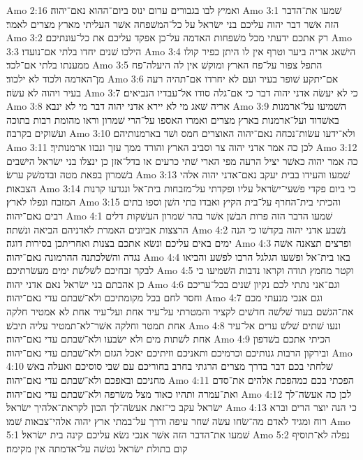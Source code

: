 Amo 2:16  ואמיץ לבו בגבורים ערום ינוס ביום־ההוא נאם־יהוה׃
Amo 3:1  שׁמעו את־הדבר הזה אשׁר דבר יהוה עליכם בני ישׂראל על כל־המשׁפחה אשׁר העליתי מארץ מצרים לאמר׃
Amo 3:2  רק אתכם ידעתי מכל משׁפחות האדמה על־כן אפקד עליכם את כל־עונתיכם׃
Amo 3:3  הילכו שׁנים יחדו בלתי אם־נועדו׃
Amo 3:4  הישׁאג אריה ביער וטרף אין לו היתן כפיר קולו ממענתו בלתי אם־לכד׃
Amo 3:5  התפל צפור על־פח הארץ ומוקשׁ אין לה היעלה־פח מן־האדמה ולכוד לא ילכוד׃
Amo 3:6  אם־יתקע שׁופר בעיר ועם לא יחרדו אם־תהיה רעה בעיר ויהוה לא עשׂה׃
Amo 3:7  כי לא יעשׂה אדני יהוה דבר כי אם־גלה סודו אל־עבדיו הנביאים׃
Amo 3:8  אריה שׁאג מי לא יירא אדני יהוה דבר מי לא ינבא׃
Amo 3:9  השׁמיעו על־ארמנות באשׁדוד ועל־ארמנות בארץ מצרים ואמרו האספו על־הרי שׁמרון וראו מהומת רבות בתוכה ועשׁוקים בקרבה׃
Amo 3:10  ולא־ידעו עשׂות־נכחה נאם־יהוה האוצרים חמס ושׁד בארמנותיהם׃
Amo 3:11  לכן כה אמר אדני יהוה צר וסביב הארץ והורד ממך עזך ונבזו ארמנותיך׃
Amo 3:12  כה אמר יהוה כאשׁר יציל הרעה מפי הארי שׁתי כרעים או בדל־אזן כן ינצלו בני ישׂראל הישׁבים בשׁמרון בפאת מטה ובדמשׁק ערשׂ׃
Amo 3:13  שׁמעו והעידו בבית יעקב נאם־אדני יהוה אלהי הצבאות׃
Amo 3:14  כי ביום פקדי פשׁעי־ישׂראל עליו ופקדתי על־מזבחות בית־אל ונגדעו קרנות המזבח ונפלו לארץ׃
Amo 3:15  והכיתי בית־החרף על־בית הקיץ ואבדו בתי השׁן וספו בתים רבים נאם־יהוה׃
Amo 4:1  שׁמעו הדבר הזה פרות הבשׁן אשׁר בהר שׁמרון העשׁקות דלים הרצצות אביונים האמרת לאדניהם הביאה ונשׁתה׃
Amo 4:2  נשׁבע אדני יהוה בקדשׁו כי הנה ימים באים עליכם ונשׂא אתכם בצנות ואחריתכן בסירות דוגה׃
Amo 4:3  ופרצים תצאנה אשׁה נגדה והשׁלכתנה ההרמונה נאם־יהוה׃
Amo 4:4  באו בית־אל ופשׁעו הגלגל הרבו לפשׁע והביאו לבקר זבחיכם לשׁלשׁת ימים מעשׂרתיכם׃
Amo 4:5  וקטר מחמץ תודה וקראו נדבות השׁמיעו כי כן אהבתם בני ישׂראל נאם אדני יהוה׃
Amo 4:6  וגם־אני נתתי לכם נקיון שׁנים בכל־עריכם וחסר לחם בכל מקומתיכם ולא־שׁבתם עדי נאם־יהוה׃
Amo 4:7  וגם אנכי מנעתי מכם את־הגשׁם בעוד שׁלשׁה חדשׁים לקציר והמטרתי על־עיר אחת ועל־עיר אחת לא אמטיר חלקה אחת תמטר וחלקה אשׁר־לא־תמטיר עליה תיבשׁ׃
Amo 4:8  ונעו שׁתים שׁלשׁ ערים אל־עיר אחת לשׁתות מים ולא ישׂבעו ולא־שׁבתם עדי נאם־יהוה׃
Amo 4:9  הכיתי אתכם בשׁדפון ובירקון הרבות גנותיכם וכרמיכם ותאניכם וזיתיכם יאכל הגזם ולא־שׁבתם עדי נאם־יהוה׃
Amo 4:10  שׁלחתי בכם דבר בדרך מצרים הרגתי בחרב בחוריכם עם שׁבי סוסיכם ואעלה באשׁ מחניכם ובאפכם ולא־שׁבתם עדי נאם־יהוה׃
Amo 4:11  הפכתי בכם כמהפכת אלהים את־סדם ואת־עמרה ותהיו כאוד מצל משׂרפה ולא־שׁבתם עדי נאם־יהוה׃
Amo 4:12  לכן כה אעשׂה־לך ישׂראל עקב כי־זאת אעשׂה־לך הכון לקראת־אלהיך ישׂראל׃
Amo 4:13  כי הנה יוצר הרים וברא רוח ומגיד לאדם מה־שׂחו עשׂה שׁחר עיפה ודרך על־במתי ארץ יהוה אלהי־צבאות שׁמו׃
Amo 5:1  שׁמעו את־הדבר הזה אשׁר אנכי נשׂא עליכם קינה בית ישׂראל׃
Amo 5:2  נפלה לא־תוסיף קום בתולת ישׂראל נטשׁה על־אדמתה אין מקימה׃
